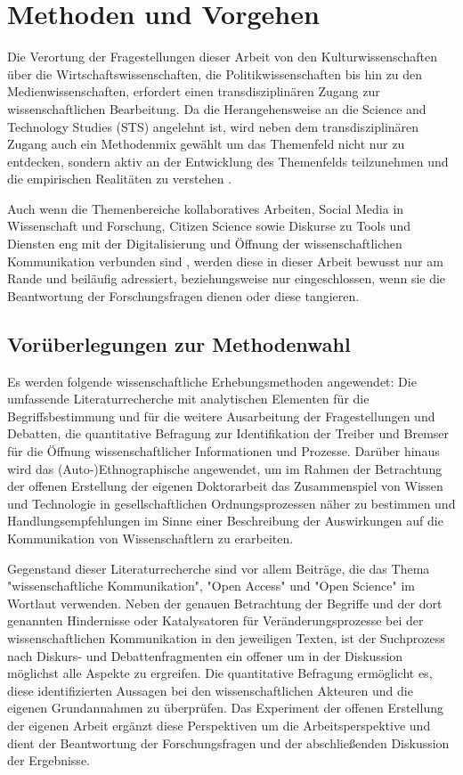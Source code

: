 \chapter{Methoden und Vorgehen}

Die Verortung der Fragestellungen dieser Arbeit von den Kulturwissenschaften über die Wirtschaftswissenschaften, die Politikwissenschaften bis hin zu den Medienwissenschaften, erfordert einen transdisziplinären Zugang zur wissenschaftlichen Bearbeitung. Da die Herangehensweise an die Science and Technology Studies (STS) angelehnt ist, wird neben dem transdisziplinären Zugang auch ein Methodenmix gewählt um das Themenfeld nicht nur zu entdecken, sondern aktiv an der Entwicklung des Themenfelds teilzunehmen \cite{MacKenzie_STS_1999} und die empirischen Realitäten zu verstehen \cite{kelty_2014_freedom}.

Auch wenn die Themenbereiche kollaboratives Arbeiten, Social Media in Wissenschaft und Forschung, Citizen Science sowie Diskurse zu Tools und Diensten eng mit der Digitalisierung und Öffnung der wissenschaftlichen Kommunikation verbunden sind \cite{eu_agenda_open_science_2015}, werden diese in dieser Arbeit bewusst nur am Rande und beiläufig adressiert, beziehungsweise nur eingeschlossen, wenn sie die Beantwortung der Forschungsfragen dienen oder diese tangieren.

\section{Vorüberlegungen zur Methodenwahl}

Es werden folgende wissenschaftliche Erhebungsmethoden angewendet: Die umfassende Literaturrecherche mit analytischen Elementen für die Begriffsbestimmung und für die weitere Ausarbeitung der Fragestellungen und Debatten, die quantitative Befragung zur Identifikation der Treiber und Bremser für die Öffnung wissenschaftlicher Informationen und Prozesse. Darüber hinaus wird das (Auto-)Ethnographische angewendet, um im Rahmen der Betrachtung der offenen Erstellung der eigenen Doktorarbeit das Zusammenspiel von Wissen und Technologie in gesellschaftlichen Ordnungsprozessen näher zu bestimmen und Handlungsempfehlungen im Sinne einer Beschreibung der Auswirkungen auf die Kommunikation von Wissenschaftlern zu erarbeiten.

Gegenstand dieser Literaturrecherche sind vor allem Beiträge, die das Thema "wissenschaftliche Kommunikation", "Open Access" und "Open Science" im Wortlaut verwenden. Neben der genauen Betrachtung der Begriffe und der dort genannten Hindernisse oder Katalysatoren für Veränderungsprozesse bei der wissenschaftlichen Kommunikation in den jeweiligen Texten, ist der Suchprozess nach Diskurs- und Debattenfragmenten ein offener um in der Diskussion möglichst alle Aspekte zu ergreifen. Die quantitative Befragung ermöglicht es, diese identifizierten Aussagen bei den wissenschaftlichen Akteuren und die eigenen Grundannahmen zu überprüfen. Das Experiment der offenen Erstellung der eigenen Arbeit ergänzt diese Perspektiven um die Arbeitsperspektive und dient der Beantwortung der Forschungsfragen und der abschließenden Diskussion der Ergebnisse.

